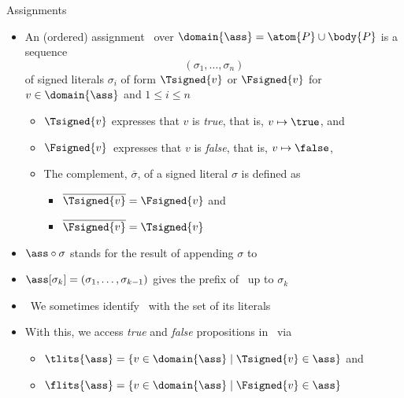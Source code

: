 \begin{frame}{Assignments}
  \begin{itemize}
  \item<2-> An (ordered) \alert{assignment} \ass\ over $\domain{\ass}=\atom{P}\cup\body{P}$
    is a sequence
    \[
    (\sigma_1,\ldots,\sigma_n)
    \]
    of \alert{signed literals}
    $\sigma_i$ of form \alert{$\Tsigned{v}$} or \alert{$\Fsigned{v}$} for
    $v\in\domain{\ass}$ and $1 \leq i \leq n$
    \medskip
    \begin{itemize}\normalsize
    \item<only@3-4> $\Tsigned{v}$   expresses that $v$ is \emph{true},\; that is, $v\mapsto\true$, and
    \item<only@3-4> $\Fsigned{v}$\, expresses that $v$ is \emph{false}, that is, $v\mapsto\false$,
      \medskip
    \item<only@4  > The complement, $\overline{\sigma}$, of a signed literal $\sigma$ is defined as
      \begin{itemize}\normalsize
      \item $\overline{\Tsigned{v}} = \Fsigned{v}$ and
      \item $\overline{\Fsigned{v}} = \Tsigned{v}$
      \end{itemize}
    \end{itemize}
  \item<only@6-> $\ass\circ\sigma$ stands for the result of appending $\sigma$ to \ass
  \item<only@6-> $\ass[\sigma_k]=(\sigma_1,\ldots,\sigma_{k-1})$ gives the prefix of \ass\ up to $\sigma_k$
    \medskip
  \item<only@7>  \ We sometimes identify \ass\ with the set of its literals
    \smallskip
  \item<only@7>
    With this,
    we access \emph{true} and \emph{false} propositions in \ass\ via
    \begin{itemize}\normalsize
    \item \( \tlits{\ass} = \{v \in \domain{\ass} \mid \Tsigned{v} \in\ass\} \) and
    \item \( \flits{\ass} = \{v \in \domain{\ass} \mid \Fsigned{v} \in\ass\} \)
    \end{itemize}
  \end{itemize}
\end{frame}
